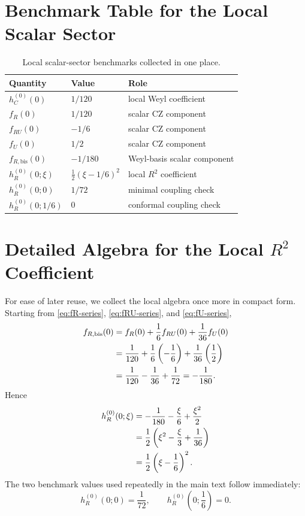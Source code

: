 \documentclass[11pt,a4paper]{article}
\theoremstyle{definition}
\theoremstyle{remark}
\begin{document}
\section{Benchmark Table for the Local Scalar Sector}
\label{app:benchmarks}

\begin{table}[ht]
\centering
\caption{Local scalar-sector benchmarks collected in one place.}
\label{tab:benchmarks}
\begin{tabular}{lll}
\toprule
Quantity & Value & Role \\
\midrule
$h_C^{(0)}(0)$ & $1/120$ & local Weyl coefficient \\
$f_R(0)$ & $1/120$ & scalar CZ component \\
$f_{RU}(0)$ & $-1/6$ & scalar CZ component \\
$f_U(0)$ & $1/2$ & scalar CZ component \\
$f_{R,\mathrm{bis}}(0)$ & $-1/180$ & Weyl-basis scalar component \\
$h_R^{(0)}(0;\xi)$ & $\frac{1}{2}(\xi-1/6)^2$ & local $R^2$ coefficient \\
$h_R^{(0)}(0;0)$ & $1/72$ & minimal coupling check \\
$h_R^{(0)}(0;1/6)$ & $0$ & conformal coupling check \\
\bottomrule
\end{tabular}
\end{table}

\section{Detailed Algebra for the Local \texorpdfstring{$R^2$}{R2} Coefficient}
\label{app:detailed-R2}

For ease of later reuse, we collect the local algebra once more in compact
form.  Starting from \eqref{eq:fR-series}, \eqref{eq:fRU-series}, and
\eqref{eq:fU-series},
\begin{align}
  f_{R,\mathrm{bis}}(0)
  &= f_R(0) + \frac{1}{6}f_{RU}(0) + \frac{1}{36}f_U(0)
  \notag\\
  &= \frac{1}{120} + \frac{1}{6}\left(-\frac{1}{6}\right)
   + \frac{1}{36}\left(\frac{1}{2}\right)
  \notag\\
  &= \frac{1}{120} - \frac{1}{36} + \frac{1}{72}
   = -\frac{1}{180}.
  \label{eq:appendix-frbis}
\end{align}
Hence
\begin{align}
  h_R^{(0)}(0;\xi)
  &= -\frac{1}{180} - \frac{\xi}{6} + \frac{\xi^2}{2}
  \notag\\
  &= \frac{1}{2}
     \left(
       \xi^2 - \frac{\xi}{3} + \frac{1}{36}
     \right)
  \notag\\
  &= \frac{1}{2}\left(\xi-\frac{1}{6}\right)^2.
  \label{eq:appendix-complete-square}
\end{align}
The two benchmark values used repeatedly in the main text follow
immediately:
\begin{equation}
  h_R^{(0)}(0;0)=\frac{1}{72},
  \qquad
  h_R^{(0)}\!\left(0;\frac{1}{6}\right)=0.
  \label{eq:appendix-benchmarks}
\end{equation}
\end{document}
